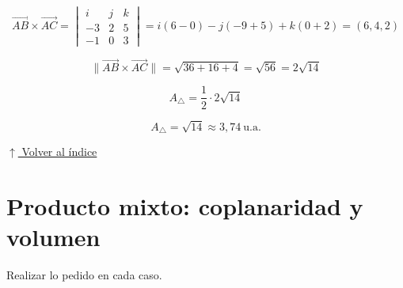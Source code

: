 \documentclass[12pt]{article}
\newcommand{\volverindice}{%
    \vspace{1em}%
    \begin{flushright}%
        \hyperlink{indice}{\small $\uparrow$ Volver al índice}%
    \end{flushright}%
}
\begin{document}
\begin{enumerate}[label=\alph*.-]
    \[
    \overrightarrow{AB}\times\overrightarrow{AC}=\begin{vmatrix}
    i & j & k\\
    -3 & 2 & 5\\
    -1 & 0 & 3
    \end{vmatrix}
    =i(6-0)-j(-9+5)+k(0+2)=(6,4,2)
    \]

    \[
    \|\overrightarrow{AB}\times\overrightarrow{AC}\|=\sqrt{36+16+4}
    =\sqrt{56}=2\sqrt{14}
    \]

    \[
    A_{\triangle}=\frac{1}{2}\cdot2\sqrt{14}
    \]

    \[
    \boxed{A_{\triangle}=\sqrt{14}\approx3{,}74\ \text{u.a.}}
    \]

\end{enumerate}

\volverindice
\newpage


\section{Producto mixto: coplanaridad y volumen}

Realizar lo pedido en cada caso.
\end{document}
